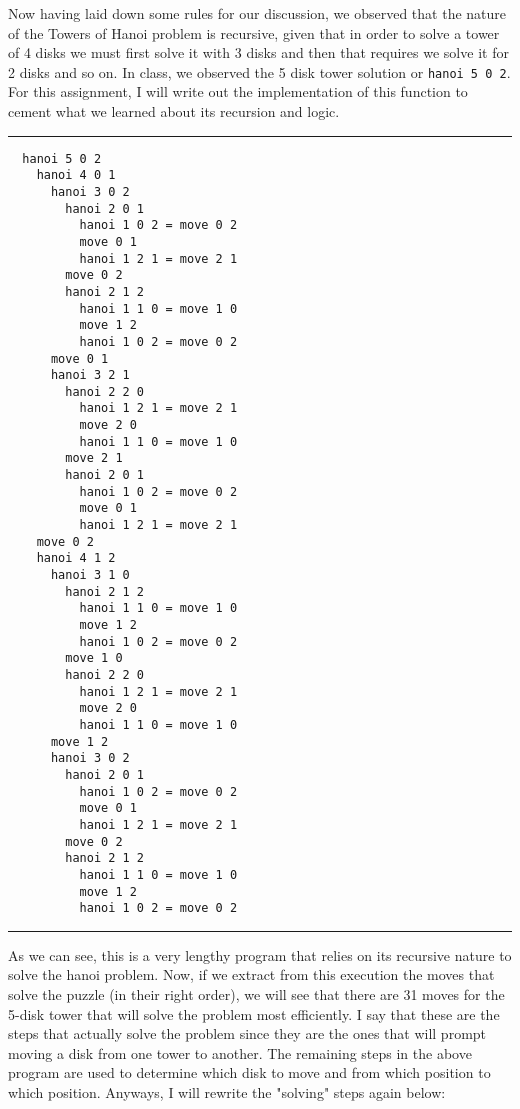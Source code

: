 \documentclass{article}
\theoremstyle{theorem}
\theoremstyle{definition}
\theoremstyle{remark}
\begin{document}
Now having laid down some rules for our discussion, we observed that the nature of the Towers of Hanoi problem is recursive, given that in order to solve a tower of 4 disks we must first solve 
it with 3 disks and then that requires we solve it for 2 disks and so on. In class, we observed the 5 disk tower solution or \texttt{hanoi 5 0 2}. For this assignment, I will write out the 
implementation of this function to cement what we learned about its recursion and logic. \\

\noindent
  {\color{gray} \rule{\linewidth}{0.05mm}}
\begin{verbatim}
  hanoi 5 0 2
    hanoi 4 0 1
      hanoi 3 0 2
        hanoi 2 0 1
          hanoi 1 0 2 = move 0 2
          move 0 1
          hanoi 1 2 1 = move 2 1
        move 0 2
        hanoi 2 1 2 
          hanoi 1 1 0 = move 1 0 
          move 1 2
          hanoi 1 0 2 = move 0 2
      move 0 1
      hanoi 3 2 1 
        hanoi 2 2 0
          hanoi 1 2 1 = move 2 1 
          move 2 0
          hanoi 1 1 0 = move 1 0
        move 2 1
        hanoi 2 0 1
          hanoi 1 0 2 = move 0 2
          move 0 1
          hanoi 1 2 1 = move 2 1
    move 0 2
    hanoi 4 1 2
      hanoi 3 1 0
        hanoi 2 1 2
          hanoi 1 1 0 = move 1 0
          move 1 2
          hanoi 1 0 2 = move 0 2
        move 1 0
        hanoi 2 2 0
          hanoi 1 2 1 = move 2 1
          move 2 0
          hanoi 1 1 0 = move 1 0
      move 1 2
      hanoi 3 0 2
        hanoi 2 0 1
          hanoi 1 0 2 = move 0 2
          move 0 1
          hanoi 1 2 1 = move 2 1
        move 0 2
        hanoi 2 1 2
          hanoi 1 1 0 = move 1 0 
          move 1 2
          hanoi 1 0 2 = move 0 2
\end{verbatim}
\noindent
  {\color{gray} \rule{\linewidth}{0.05mm}}

As we can see, this is a very lengthy program that relies on its recursive nature to solve the hanoi problem. Now, if we extract from this execution the moves that solve the puzzle (in their right order), we will see that there are 31 moves for the 5-disk tower 
that will solve the problem most efficiently. I say that these are the steps that actually solve the problem since they are the ones that will prompt moving a disk from one tower to another. The remaining steps in the above program are used to determine which disk to move 
and from which position to which position. Anyways, I will rewrite the "solving" steps again below: \\
\end{document}
